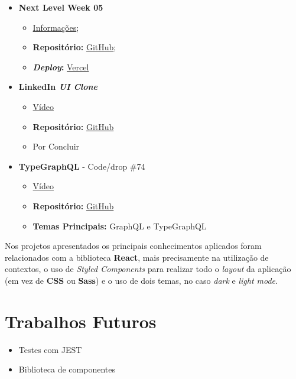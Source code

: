 \begin{minipage}[Ht]{0.45\textwidth}
	\begin{itemize}
		\item \textbf{Next Level Week 05}
			\begin{itemize}
				\item \href{http://nextlevelweek.com/}{Informações};
				\item \textbf{Repositório:} \href{https://github.com/TutoDS/nlw05-react}{GitHub};
				\item \textbf{\textit{Deploy}:} \href{https://podcastr-tutods.vercel.app/}{Vercel}
			\end{itemize}

		\item \textbf{LinkedIn \textit{UI Clone}}
			\begin{itemize}
				\item \href{https://www.youtube.com/watch?v=xP3cxbDUtrc}{Vídeo}
				\item \textbf{Repositório:} \href{https://github.com/TutoDS/reactjs-linkedin-clone}{GitHub}
				\item Por Concluir
			\end{itemize}

		\item \textbf{TypeGraphQL} - Code/drop \#74
			\begin{itemize}
				\item \href{https://www.youtube.com/watch?v=qMc5A5-Ktuw}{Vídeo}
				\item \textbf{Repositório:} \href{https://github.com/TutoDS/typegraphql-code-drops-74}{GitHub}
				\item \textbf{Temas Principais:} GraphQL e TypeGraphQL
			\end{itemize}
	\end{itemize}
\end{minipage}

\vspace{10pt}

Nos projetos apresentados os principais conhecimentos aplicados foram relacionados com a biblioteca \textbf{React}, mais precisamente na utilização de contextos, o uso de \textit{Styled Components} para realizar todo o \textit{layout} da aplicação (em vez de \textbf{CSS} ou \textbf{Sass}) e o uso de dois temas, no caso \textit{dark} e \textit{light mode}.

\section{Trabalhos Futuros}

\begin{itemize}
	\item Testes com JEST
	\item Biblioteca de componentes
\end{itemize}